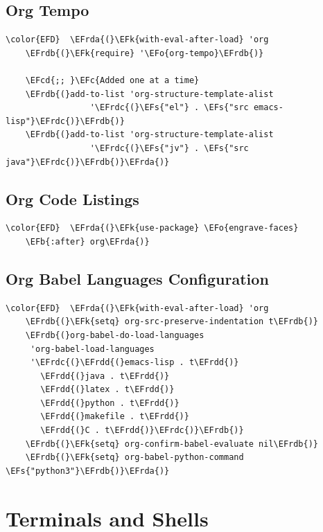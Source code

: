 \documentclass[11pt]{article}
\newcommand{\EFc}[1]{\textcolor{EFc}{#1}} %
\newcommand{\EFcd}[1]{\textcolor{EFcd}{#1}} %
\newcommand{\EFs}[1]{\textcolor{EFs}{#1}} %
\newcommand{\EFk}[1]{\textcolor{EFk}{#1}} %
\newcommand{\EFb}[1]{\textcolor{EFb}{#1}} %
\newcommand{\EFo}[1]{\textcolor{EFo}{#1}} %
\newcommand{\EFrda}[1]{\textcolor{EFrda}{#1}} %
\newcommand{\EFrdb}[1]{\textcolor{EFrdb}{#1}} %
\newcommand{\EFrdc}[1]{\textcolor{EFrdc}{#1}} %
\newcommand{\EFrdd}[1]{\textcolor{EFrdd}{#1}} %
\begin{document}
\subsection{Org Tempo}
\label{sec:org7b8b245}
\begin{Code}
\begin{Verbatim}
\color{EFD}  \EFrda{(}\EFk{with-eval-after-load} 'org
    \EFrdb{(}\EFk{require} '\EFo{org-tempo}\EFrdb{)}

    \EFcd{;; }\EFc{Added one at a time}
    \EFrdb{(}add-to-list 'org-structure-template-alist
                 '\EFrdc{(}\EFs{"el"} . \EFs{"src emacs-lisp"}\EFrdc{)}\EFrdb{)}
    \EFrdb{(}add-to-list 'org-structure-template-alist
                 '\EFrdc{(}\EFs{"jv"} . \EFs{"src java"}\EFrdc{)}\EFrdb{)}\EFrda{)}
\end{Verbatim}
\end{Code}

\subsection{Org Code Listings}
\label{sec:org5f37662}
\begin{Code}
\begin{Verbatim}
\color{EFD}  \EFrda{(}\EFk{use-package} \EFo{engrave-faces}
    \EFb{:after} org\EFrda{)}
\end{Verbatim}
\end{Code}

\subsection{Org Babel Languages Configuration}
\label{sec:orgb5c0b13}
\begin{Code}
\begin{Verbatim}
\color{EFD}  \EFrda{(}\EFk{with-eval-after-load} 'org
    \EFrdb{(}\EFk{setq} org-src-preserve-indentation t\EFrdb{)}
    \EFrdb{(}org-babel-do-load-languages
     'org-babel-load-languages
     '\EFrdc{(}\EFrdd{(}emacs-lisp . t\EFrdd{)}
       \EFrdd{(}java . t\EFrdd{)}
       \EFrdd{(}latex . t\EFrdd{)}
       \EFrdd{(}python . t\EFrdd{)}
       \EFrdd{(}makefile . t\EFrdd{)}
       \EFrdd{(}C . t\EFrdd{)}\EFrdc{)}\EFrdb{)}
    \EFrdb{(}\EFk{setq} org-confirm-babel-evaluate nil\EFrdb{)}
    \EFrdb{(}\EFk{setq} org-babel-python-command \EFs{"python3"}\EFrdb{)}\EFrda{)}
\end{Verbatim}
\end{Code}

\section{Terminals and Shells}
\label{sec:orgaf09f40}
\end{document}
